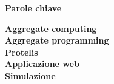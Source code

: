 \clearemptydoublepage{}
\thispagestyle{empty}
\vspace*{20ex}
\begin{flushright}
    \begin{LARGE}
        \textbf{Parole chiave}\\
        \vspace{5ex}
    \end{LARGE}
    \begin{normalsize}
      \textbf{%
        Aggregate computing\\%
        \medskip
        Aggregate programming\\%
        \medskip
        Protelis\\%
        \medskip
        Applicazione web\\%
        \medskip
        Simulazione
      }
    \end{normalsize}
\end{flushright}
\vfill
